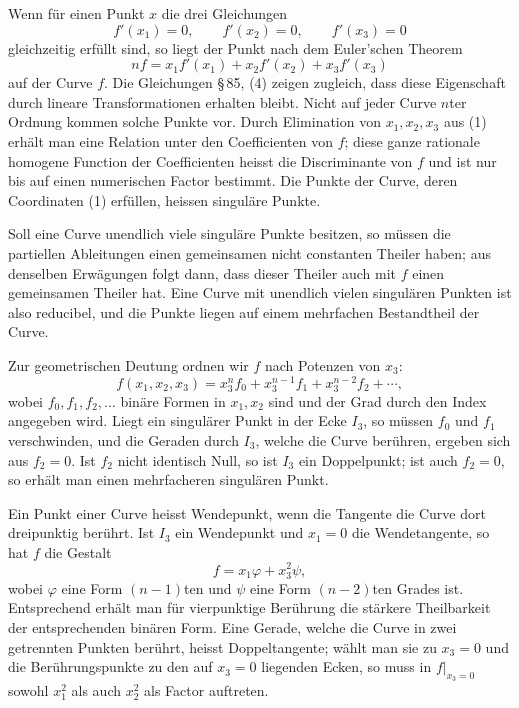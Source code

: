 \documentclass[11pt]{article}
\begin{document}
Wenn für einen Punkt $x$ die drei Gleichungen
\begin{equation}
 f'(x_1)=0,\qquad f'(x_2)=0,\qquad f'(x_3)=0
 \tag{1}
\end{equation}
gleichzeitig erfüllt sind, so liegt der Punkt nach dem Euler'schen Theorem
\begin{equation}
 nf=x_1f'(x_1)+x_2f'(x_2)+x_3f'(x_3)
 \tag{2}
\end{equation}
auf der Curve $f$. Die Gleichungen \S\,85, (4) zeigen zugleich, dass diese Eigenschaft durch lineare Transformationen erhalten bleibt. Nicht auf jeder Curve $n$ter Ordnung kommen solche Punkte vor. Durch Elimination von $x_1,x_2,x_3$ aus (1) erhält man eine Relation unter den Coefficienten von $f$; diese ganze rationale homogene Function der Coefficienten heisst die Discriminante von $f$ und ist nur bis auf einen numerischen Factor bestimmt. Die Punkte der Curve, deren Coordinaten (1) erfüllen, heissen singuläre Punkte.

Soll eine Curve unendlich viele singuläre Punkte besitzen, so müssen die partiellen Ableitungen einen gemeinsamen nicht constanten Theiler haben; aus denselben Erwägungen folgt dann, dass dieser Theiler auch mit $f$ einen gemeinsamen Theiler hat. Eine Curve mit unendlich vielen singulären Punkten ist also reducibel, und die Punkte liegen auf einem mehrfachen Bestandtheil der Curve.

Zur geometrischen Deutung ordnen wir $f$ nach Potenzen von $x_3$:
\begin{equation}
 f(x_1,x_2,x_3)=x_3^n f_0+x_3^{n-1}f_1+x_3^{n-2}f_2+\cdots,
 \tag{3}
\end{equation}
wobei $f_0,f_1,f_2,\ldots$ binäre Formen in $x_1,x_2$ sind und der Grad durch den Index angegeben wird. Liegt ein singulärer Punkt in der Ecke $I_3$, so müssen $f_0$ und $f_1$ verschwinden, und die Geraden durch $I_3$, welche die Curve berühren, ergeben sich aus $f_2=0$. Ist $f_2$ nicht identisch Null, so ist $I_3$ ein Doppelpunkt; ist auch $f_2=0$, so erhält man einen mehrfacheren singulären Punkt.

Ein Punkt einer Curve heisst Wendepunkt, wenn die Tangente die Curve dort dreipunktig berührt. Ist $I_3$ ein Wendepunkt und $x_1=0$ die Wendetangente, so hat $f$ die Gestalt
\begin{equation}
 f=x_1\varphi+x_3^2\psi,
 \tag{4}
\end{equation}
wobei $\varphi$ eine Form $(n-1)$ten und $\psi$ eine Form $(n-2)$ten Grades ist. Entsprechend erhält man für vierpunktige Berührung die stärkere Theilbarkeit der entsprechenden binären Form. Eine Gerade, welche die Curve in zwei getrennten Punkten berührt, heisst Doppeltangente; wählt man sie zu $x_3=0$ und die Berührungspunkte zu den auf $x_3=0$ liegenden Ecken, so muss in $f\vert_{x_3=0}$ sowohl $x_1^2$ als auch $x_2^2$ als Factor auftreten.
\end{document}
